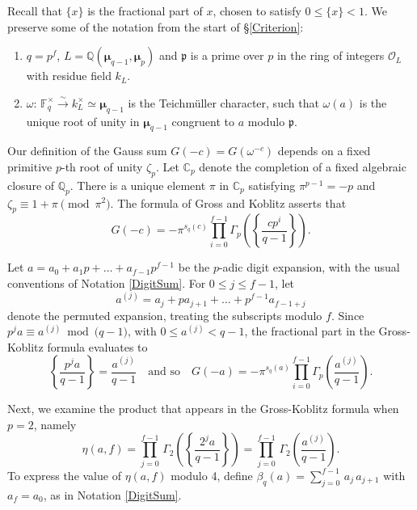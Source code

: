 \documentclass[12pt]{amsart}  \usepackage{amsmath,amssymb,enumerate,amscd,tikz,url}
\numberwithin{equation}{section}
\theoremstyle{definition}
\newcommand{\C}{{\mathbb C}}
\newcommand{\F}{{\mathbb F}}
\newcommand{\Q}{{\mathbb Q}}
\newcommand{\Mu}{\boldsymbol \mu}
\newcommand{\gp}{{\mathfrak p}}
\newcommand{\cO}{{\mathcal O}}
\begin{document}
Recall that $\{x\}$ is the fractional part of $x$, chosen to satisfy $0 \le \{x\} < 1$.  We preserve some of the notation from the start of \S\ref{Criterion}:
\begin{enumerate} [\hspace{2 pt} $\bullet$]
\item     $q = p^f$, $L = \Q(\Mu_{q-1}, \Mu_p)$ and $\gp$ is a prime over $p$ in the ring of integers $\cO_L$ with residue field $k_L$. \vspace{2 pt}
\item     $\omega\!: \, \F_q^\times \xrightarrow{\sim} k_L^\times \simeq \Mu_{q-1}$ is the Teichm\"uller character, such that $\omega(a)$ is the unique root of unity in $\Mu_{q-1}$ congruent to $a$ modulo $\gp$.  
\end{enumerate}
Our definition of the Gauss sum $G(-c) = G(\omega^{-c})$ depends on a fixed primitive $p$-th root of unity $\zeta_p$.   Let $\C_p$ denote the completion of a fixed algebraic closure of $\Q_p$.  There is a unique element $\pi$ in $\C_p$ satisfying $\pi^{p-1} = -p$ and $\zeta_p \equiv 1+\pi \pmod{\pi^2}$.  The formula of Gross and Koblitz asserts that
\begin{equation} \label{Gross-Koblitz}
G(-c) = -\pi^{s_q(c)}\prod_{i=0}^{f-1}\Gamma_p\left(\left\{\frac{cp^i}{q-1}\right\}\right).
\end{equation}

Let $a = a_0 + a_1 p + \dots + a_{f-1} p^{f-1}$ be the $p$-adic digit expansion, with the usual conventions of Notation \ref{DigitSum}.  For $0 \le j \le f-1$, let 
$$
a^{(j)} = a_j + pa_{j+1} + \dots + p^{f-1} a_{f-1+j}
$$ 
denote the permuted expansion, treating the subscripts modulo $f$.  Since $p^j a \equiv a^{(j)} \bmod{(q-1})$, with $0 \le a^{(j)} < q-1$, the fractional part in the Gross-Koblitz formula evaluates to
\begin{equation} \label{GammaIdent}
\left\{\frac{p^j a}{q-1}\right\} = \frac{a^{(j)}}{q-1} \quad \text{and so} \quad G(-a) = -\pi^{s_q(a)}\prod_{i=0}^{f-1}\Gamma_p\left(\frac{a^{(j)}}{q-1}\right).
\end{equation}

\vspace{5 pt}

Next, we examine the product that appears in the Gross-Koblitz formula when $p=2$, namely
\begin{equation} \label{sn}
\eta(a,f) = \prod_{j=0}^{f-1} \, \Gamma_2\left(\left\{\frac{2^j a}{q-1}\right\}\right) = \prod_{j=0}^{f-1} \, \Gamma_2\left(\frac{a^{(j)}}{q-1}\right).
\end{equation}
To express the value of $\eta(a,f)$  modulo 4, define $\beta_q(a) = \sum_{j = 0}^{f-1} \, a_j \, a_{j+1}$ with $a_f = a_0$, as in Notation \ref{DigitSum}.
\end{document}
